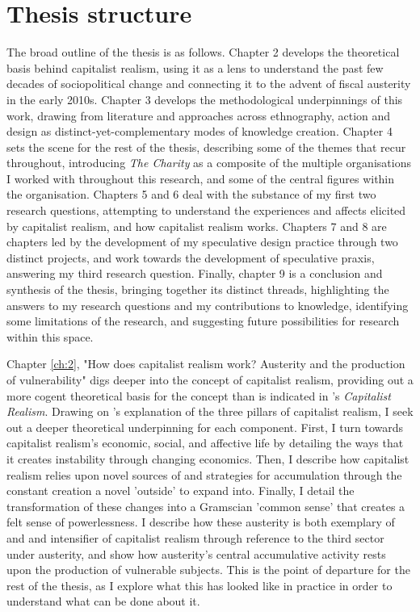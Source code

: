 \section{Thesis structure}
The broad outline of the thesis is as follows. Chapter 2 develops the theoretical basis behind capitalist realism, using it as a lens to understand the past few decades of sociopolitical change and connecting it to the advent of fiscal austerity in the early 2010s. Chapter 3 develops the methodological underpinnings of this work, drawing from literature and approaches across ethnography, action and design as distinct-yet-complementary modes of knowledge creation. Chapter 4 sets the scene for the rest of the thesis, describing some of the themes that recur throughout, introducing \textit{The Charity} as a composite of the multiple organisations I worked with throughout this research, and some of the central figures within the organisation. Chapters 5 and 6 deal with the substance of my first two research questions, attempting to understand the experiences and affects elicited by capitalist realism, and how capitalist realism works. Chapters 7 and 8 are chapters led by the development of my speculative design practice through two distinct projects, and work towards the development of speculative praxis, answering my third research question. Finally, chapter 9 is a conclusion and synthesis of the thesis, bringing together its distinct threads, highlighting the answers to my research questions and my contributions to knowledge, identifying some limitations of the research, and suggesting future possibilities for research within this space.

Chapter \ref{ch:2}, "How does capitalist realism work? Austerity and the production of vulnerability" digs deeper into the concept of capitalist realism, providing out a more cogent theoretical basis for the concept than is indicated in \citet{fisher_capitalist_2009}'s \textit{Capitalist Realism}. Drawing on \cite{shonkwiler_reading_2014}'s explanation of the three pillars of capitalist realism, I seek out a deeper theoretical underpinning for each component. First, I turn towards capitalist realism's economic, social, and affective life by detailing the ways that it creates instability through changing economics. Then, I describe how capitalist realism relies upon novel sources of and strategies for accumulation through the constant creation a novel 'outside' to expand into. Finally, I detail the transformation of these changes into a Gramscian 'common sense' that creates a felt sense of powerlessness. I describe how these austerity is both exemplary of and and intensifier of capitalist realism through reference to the third sector under austerity, and show how austerity's central accumulative activity rests upon the production of vulnerable subjects. This is the point of departure for the rest of the thesis, as I explore what this has looked like in practice in order to understand what can be done about it. 


